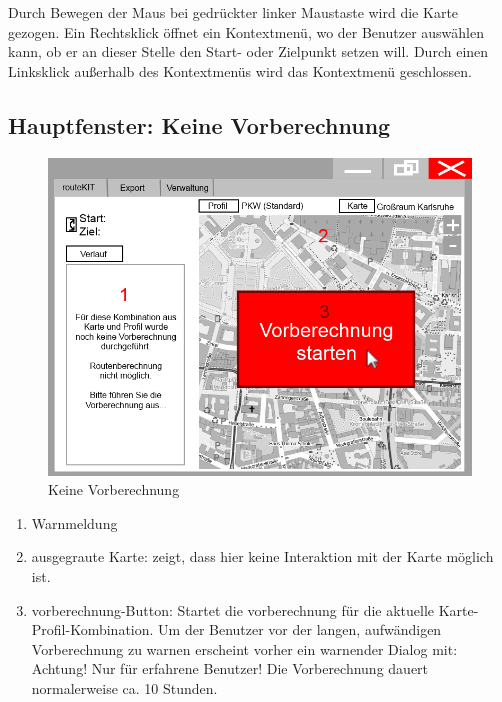 \documentclass[a4paper, 11pt]{article}
\begin{document}
Durch Bewegen der Maus bei gedrückter linker Maustaste wird die Karte gezogen. Ein Rechtsklick öffnet ein Kontextmenü, wo der Benutzer auswählen kann, ob er an dieser Stelle den Start- oder Zielpunkt setzen will. Durch einen Linksklick außerhalb des Kontextmenüs wird das Kontextmenü geschlossen.

\subsection{Hauptfenster: Keine Vorberechnung}
\begin{figure}[H]
\centering
\includegraphics[width=0.7\linewidth]{mockup_screenshot_nicht_berechnet}
\caption{Keine Vorberechnung}
\label{fig:mockupscreenshotkeinevorberechnung}
\end{figure}
\begin{enumerate}
\item Warnmeldung
\item ausgegraute Karte: zeigt, dass hier keine Interaktion mit der Karte möglich ist.
\item \gls{vorberechnung}-Button: Startet die \gls{vorberechnung} für die aktuelle Karte-Profil-Kombination. Um der Benutzer vor der langen, aufwändigen Vorberechnung zu warnen erscheint vorher ein warnender Dialog mit:\\
Achtung! Nur für erfahrene Benutzer! Die Vorberechnung dauert normalerweise ca. 10 Stunden.
\end{enumerate}
\end{document}
